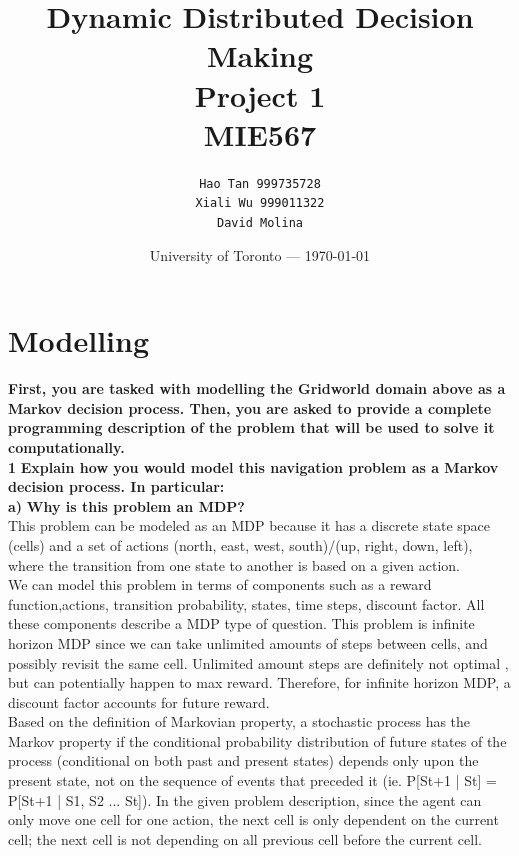 \documentclass[11pt]{article}
\title{Dynamic Distributed Decision Making \\Project 1 \\MIE567} %
\author{\texttt{Hao Tan 999735728}\\ \texttt{Xiali Wu 999011322} \\ \texttt{David Molina}} %
\date{University of Toronto --- \today} %
\begin{document}
\maketitle

\section{Modelling}
\textbf{First, you are tasked with modelling the Gridworld domain
above as a Markov decision process. Then, you are asked to provide a complete
programming description of the problem that will be used to solve it
computationally.}
\\

\noindent
\textbf{1}
\noindent
\textbf{Explain how you would model this navigation problem as a Markov
decision process. In particular:}
\\

\noindent
\textbf{a)}
\noindent
\textbf{Why is this problem an MDP? }
\\

\noindent
This problem can be modeled as an MDP because it has a discrete state space
(cells) and a set of actions (north, east, west, south)/(up, right, down, left),
where the transition from one state to another is based on a given action.
\\

\noindent
We can model this problem in terms of components such as a reward
function,actions, transition probability, states, time steps, discount factor.
All these components describe a MDP type of question. This problem is infinite
horizon MDP since we can take unlimited amounts of steps between cells, and
possibly revisit the same cell. Unlimited amount steps are definitely not
optimal , but can potentially happen to max reward. Therefore, for infinite
horizon MDP, a discount factor accounts for future reward.
\\

\noindent
Based on the definition of Markovian property, a stochastic process has the
Markov property if the conditional probability distribution of future states of
the process (conditional on both past and present states) depends only upon the
present state, not on the sequence of events that preceded it (ie. P[St+1 | St]
= P[St+1 | S1, S2 ... St]). In the given problem description, since the agent
can only move one cell for one action, the next cell is only dependent on the
current cell; the next cell is not depending on all previous cell before the
current cell.
\\
\end{document}
